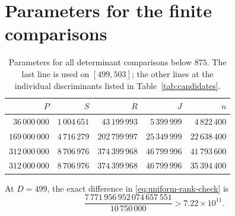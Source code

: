 \section{Parameters for the finite comparisons}\label{supp:parameters}
\begin{table}[ht]
\centering
\begin{tabular}{rrrrr}
\toprule
$P$ & $S$ & $R$ & $J$ & $n$\\
\midrule
$36\,000\,000$ & $1\,004\,651$ & $43\,199\,993$ & $5\,399\,999$ & $4\,822\,400$\\
$169\,000\,000$ & $4\,716\,279$ & $202\,799\,997$ & $25\,349\,999$ & $22\,638\,400$\\
$312\,000\,000$ & $8\,706\,976$ & $374\,399\,968$ & $46\,799\,996$ & $41\,793\,600$\\
$312\,000\,000$ & $8\,706\,976$ & $374\,399\,968$ & $46\,799\,996$ & $35\,394\,400$\\
\bottomrule
\end{tabular}
\caption{Parameters for all determinant comparisons below $875$. The last
line is used on $[499,503]$; the other lines at the individual discriminants
listed in Table~\ref{tab:candidates}.}
\label{tab:parameters}
\end{table}



At $D=499$, the exact difference in \eqref{eq:uniform-rank-check} is
\begin{equation}\label{eq:exact-rank-margin}
 \frac{7\,771\,956\,952\,074\,657\,551}{10\,750\,000}>7.22\times10^{11}.
\end{equation}
